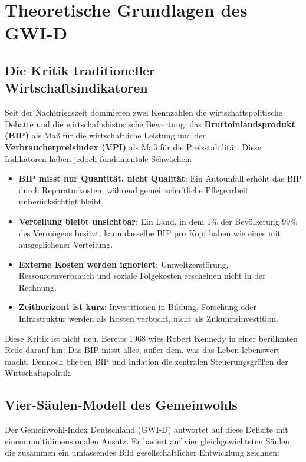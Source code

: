 \chapter{Theoretische Grundlagen des GWI-D}

\section{Die Kritik traditioneller Wirtschaftsindikatoren}

Seit der Nachkriegszeit dominieren zwei Kennzahlen die wirtschaftspolitische Debatte und die wirtschaftshistorische Bewertung: das \textbf{Bruttoinlandsprodukt (BIP)} als Maß für die wirtschaftliche Leistung und der \textbf{Verbraucherpreisindex (VPI)} als Maß für die Preisstabilität. Diese Indikatoren haben jedoch fundamentale Schwächen:

\begin{itemize}
\item \textbf{BIP misst nur Quantität, nicht Qualität}: Ein Autounfall erhöht das BIP durch Reparaturkosten, während gemeinschaftliche Pflegearbeit unberücksichtigt bleibt.
\item \textbf{Verteilung bleibt unsichtbar}: Ein Land, in dem 1\% der Bevölkerung 99\% des Vermögens besitzt, kann dasselbe BIP pro Kopf haben wie eines mit ausgeglichener Verteilung.
\item \textbf{Externe Kosten werden ignoriert}: Umweltzerstörung, Ressourcenverbrauch und soziale Folgekosten erscheinen nicht in der Rechnung.
\item \textbf{Zeithorizont ist kurz}: Investitionen in Bildung, Forschung oder Infrastruktur werden als Kosten verbucht, nicht als Zukunftsinvestition.
\end{itemize}

Diese Kritik ist nicht neu. Bereits 1968 wies Robert Kennedy in einer berühmten Rede darauf hin: \glqq{}Das BIP misst alles, außer dem, was das Leben lebenswert macht.\grqq{} Dennoch blieben BIP und Inflation die zentralen Steuerungsgrößen der Wirtschaftspolitik.

\section{Vier-Säulen-Modell des Gemeinwohls}

Der Gemeinwohl-Index Deutschland (GWI-D) antwortet auf diese Defizite mit einem multidimensionalen Ansatz. Er basiert auf vier gleichgewichteten Säulen, die zusammen ein umfassendes Bild gesellschaftlicher Entwicklung zeichnen:

